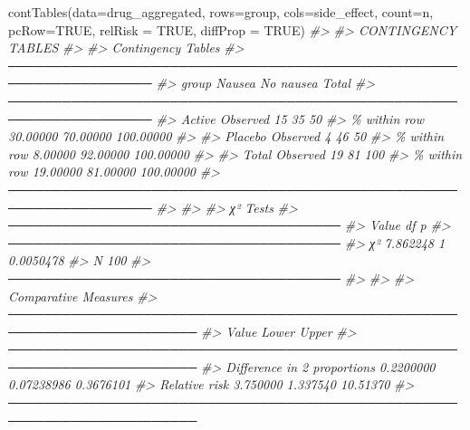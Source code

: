 \documentclass[
]{memoir}
\newenvironment{Shaded}{\begin{snugshade}}{\end{snugshade}}
\newcommand{\AttributeTok}[1]{\textcolor[rgb]{0.77,0.63,0.00}{#1}}
\newcommand{\CommentTok}[1]{\textcolor[rgb]{0.56,0.35,0.01}{\textit{#1}}}
\newcommand{\ConstantTok}[1]{\textcolor[rgb]{0.00,0.00,0.00}{#1}}
\newcommand{\FunctionTok}[1]{\textcolor[rgb]{0.00,0.00,0.00}{#1}}
\newcommand{\NormalTok}[1]{#1}
\begin{document}
\begin{Shaded}
\begin{Highlighting}[]
\FunctionTok{contTables}\NormalTok{(}\AttributeTok{data=}\NormalTok{drug\_aggregated, }\AttributeTok{rows=}\NormalTok{group, }\AttributeTok{cols=}\NormalTok{side\_effect, }\AttributeTok{count=}\NormalTok{n, }\AttributeTok{pcRow=}\ConstantTok{TRUE}\NormalTok{, }\AttributeTok{relRisk =} \ConstantTok{TRUE}\NormalTok{, }\AttributeTok{diffProp =} \ConstantTok{TRUE}\NormalTok{)}
\CommentTok{\#\textgreater{} }
\CommentTok{\#\textgreater{}  CONTINGENCY TABLES}
\CommentTok{\#\textgreater{} }
\CommentTok{\#\textgreater{}  Contingency Tables                                                 }
\CommentTok{\#\textgreater{}  ────────────────────────────────────────────────────────────────── }
\CommentTok{\#\textgreater{}    group                      Nausea       No nausea    Total       }
\CommentTok{\#\textgreater{}  ────────────────────────────────────────────────────────────────── }
\CommentTok{\#\textgreater{}    Active     Observed               15           35           50   }
\CommentTok{\#\textgreater{}               \% within row     30.00000     70.00000    100.00000   }
\CommentTok{\#\textgreater{}                                                                     }
\CommentTok{\#\textgreater{}    Placebo    Observed                4           46           50   }
\CommentTok{\#\textgreater{}               \% within row      8.00000     92.00000    100.00000   }
\CommentTok{\#\textgreater{}                                                                     }
\CommentTok{\#\textgreater{}    Total      Observed               19           81          100   }
\CommentTok{\#\textgreater{}               \% within row     19.00000     81.00000    100.00000   }
\CommentTok{\#\textgreater{}  ────────────────────────────────────────────────────────────────── }
\CommentTok{\#\textgreater{} }
\CommentTok{\#\textgreater{} }
\CommentTok{\#\textgreater{}  χ² Tests                              }
\CommentTok{\#\textgreater{}  ───────────────────────────────────── }
\CommentTok{\#\textgreater{}          Value       df    p           }
\CommentTok{\#\textgreater{}  ───────────────────────────────────── }
\CommentTok{\#\textgreater{}    χ²    7.862248     1    0.0050478   }
\CommentTok{\#\textgreater{}    N          100                      }
\CommentTok{\#\textgreater{}  ───────────────────────────────────── }
\CommentTok{\#\textgreater{} }
\CommentTok{\#\textgreater{} }
\CommentTok{\#\textgreater{}  Comparative Measures                                                    }
\CommentTok{\#\textgreater{}  ─────────────────────────────────────────────────────────────────────── }
\CommentTok{\#\textgreater{}                                   Value        Lower         Upper       }
\CommentTok{\#\textgreater{}  ─────────────────────────────────────────────────────────────────────── }
\CommentTok{\#\textgreater{}    Difference in 2 proportions    0.2200000    0.07238986    0.3676101   }
\CommentTok{\#\textgreater{}    Relative risk                   3.750000      1.337540     10.51370   }
\CommentTok{\#\textgreater{}  ───────────────────────────────────────────────────────────────────────}
\end{Highlighting}
\end{Shaded}
\end{document}
